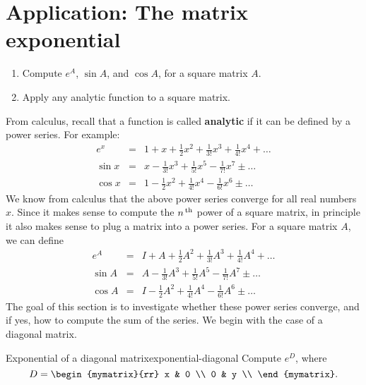 \section{Application: The matrix exponential}

\begin{outcome}
  \begin{enumerate}
  \item Compute $e^A$, $\sin A$, and $\cos A$, for a square matrix $A$.
  \item Apply any analytic function to a square matrix.
  \end{enumerate}
\end{outcome}

From calculus, recall that a function is called \textbf{analytic}%
 if it can be defined by a power series. For example:
\begin{eqnarray*}
  e^{x} &=& 1 + x + \frac{1}{2}x^2 + \frac{1}{3!}x^3 + \frac{1}{4!}x^4 + \ldots \\
  \sin x &=& x - \frac{1}{3!}x^3 + \frac{1}{5!}x^5 - \frac{1}{7!}x^7 \pm \ldots \\
  \cos x &=& 1 - \frac{1}{2}x^2 + \frac{1}{4!}x^4 - \frac{1}{6!}x^6 \pm \ldots
\end{eqnarray*}
We know from calculus that the above power series converge for all
real numbers $x$. Since it makes sense to compute the $n^{\,\rm th}$ power of
a square matrix, in principle it also makes sense to plug a matrix
into a power series. For a square matrix $A$, we can define
\begin{eqnarray*}
  e^{A} &=& I + A + \frac{1}{2}A^2 + \frac{1}{3!}A^3 + \frac{1}{4!}A^4 + \ldots \\
  \sin A &=& A - \frac{1}{3!}A^3 + \frac{1}{5!}A^5 - \frac{1}{7!}A^7 \pm \ldots \\
  \cos A &=& I - \frac{1}{2}A^2 + \frac{1}{4!}A^4 - \frac{1}{6!}A^6 \pm \ldots
\end{eqnarray*}
The goal of this section is to investigate whether these power series
converge, and if yes, how to compute the sum of the series. We begin
with the case of a diagonal matrix.

\begin{example}{Exponential of a diagonal matrix}{exponential-diagonal}
  Compute $e^{D}$, where
  \begin{equation*}
    D = \begin{mymatrix}{rr}
      x & 0 \\
      0 & y \\
    \end{mymatrix}.
  \end{equation*}
\end{example}

